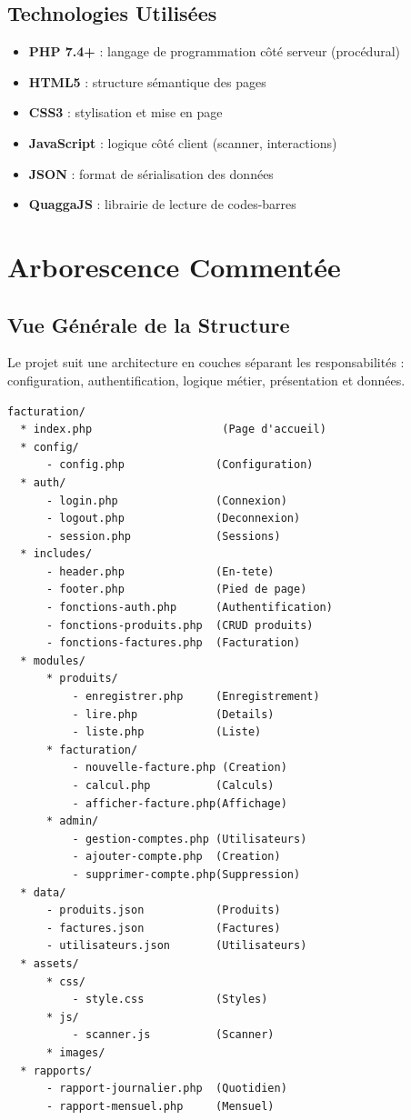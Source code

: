 \documentclass[12pt,a4paper]{report}
\begin{document}
\section{Technologies Utilisées}

\begin{itemize}
    \item \textbf{PHP 7.4+} : langage de programmation côté serveur (procédural)
    \item \textbf{HTML5} : structure sémantique des pages
    \item \textbf{CSS3} : stylisation et mise en page
    \item \textbf{JavaScript} : logique côté client (scanner, interactions)
    \item \textbf{JSON} : format de sérialisation des données
    \item \textbf{QuaggaJS} : librairie de lecture de codes-barres
\end{itemize}

\chapter{Arborescence Commentée}

\section{Vue Générale de la Structure}

Le projet suit une architecture en couches séparant les responsabilités : configuration, authentification, logique métier, présentation et données.

\begin{verbatim}
facturation/
  * index.php                    (Page d'accueil)
  * config/
      - config.php              (Configuration)
  * auth/
      - login.php               (Connexion)
      - logout.php              (Deconnexion)
      - session.php             (Sessions)
  * includes/
      - header.php              (En-tete)
      - footer.php              (Pied de page)
      - fonctions-auth.php      (Authentification)
      - fonctions-produits.php  (CRUD produits)
      - fonctions-factures.php  (Facturation)
  * modules/
      * produits/
          - enregistrer.php     (Enregistrement)
          - lire.php            (Details)
          - liste.php           (Liste)
      * facturation/
          - nouvelle-facture.php (Creation)
          - calcul.php          (Calculs)
          - afficher-facture.php(Affichage)
      * admin/
          - gestion-comptes.php (Utilisateurs)
          - ajouter-compte.php  (Creation)
          - supprimer-compte.php(Suppression)
  * data/
      - produits.json           (Produits)
      - factures.json           (Factures)
      - utilisateurs.json       (Utilisateurs)
  * assets/
      * css/
          - style.css           (Styles)
      * js/
          - scanner.js          (Scanner)
      * images/
  * rapports/
      - rapport-journalier.php  (Quotidien)
      - rapport-mensuel.php     (Mensuel)
\end{verbatim}
\end{document}
